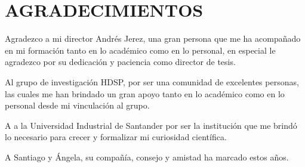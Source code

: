 \chapter*{AGRADECIMIENTOS}

Agradezco a mi director Andrés Jerez, una gran persona que me ha acompañado en mi formación tanto en lo académico como en lo personal, en especial le agradezco por su dedicación y paciencia como director de tesis.

Al grupo de investigación HDSP, por ser una comunidad de excelentes personas, las cuales me han brindado un gran apoyo tanto en lo académico como en lo personal desde mi vinculación al grupo.

A a la Universidad Industrial de Santander por ser la institución que me brindó lo necesario para crecer y formalizar mi curiosidad científica.

A Santiago y Ángela, su compañía, consejo y amistad ha marcado estos años.


\newpage 